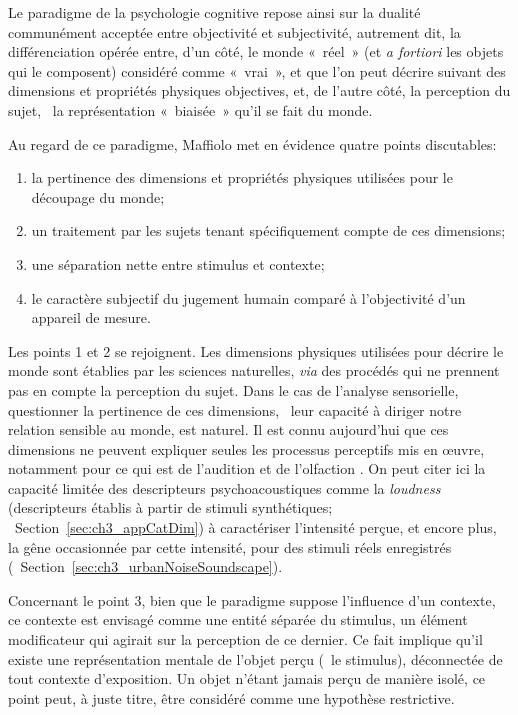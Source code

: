 Le paradigme de la psychologie cognitive repose ainsi sur la dualité communément acceptée entre objectivité et subjectivité, autrement dit, la différenciation opérée entre, d'un côté, le monde «~réel~» (et \emph{a fortiori} les objets qui le composent) considéré comme «~vrai~», et que l'on peut décrire suivant des dimensions et propriétés physiques objectives, et, de l'autre côté, la perception du sujet, \ie~la représentation «~biaisée~» qu'il se fait du monde.

Au regard de ce paradigme, Maffiolo met en évidence quatre points discutables:

\begin{enumerate}
\item la pertinence des dimensions et propriétés physiques utilisées pour le découpage du monde; 
\item un traitement par les sujets tenant spécifiquement compte de ces dimensions;
\item une séparation nette entre stimulus et contexte;
\item le caractère subjectif du jugement humain comparé à l'objectivité d'un appareil de mesure.
\end{enumerate}


Les points 1 et 2 se rejoignent. Les dimensions physiques utilisées pour décrire le monde sont établies par les sciences naturelles, \emph{via} des procédés qui ne prennent pas en compte la perception du sujet. Dans le cas de l'analyse sensorielle, questionner la pertinence de ces dimensions, \ie~leur capacité à diriger notre relation sensible au monde, est naturel. Il est connu aujourd'hui que ces dimensions ne peuvent expliquer seules les processus perceptifs mis en œuvre, notamment pour ce qui est de l'audition et de l'olfaction \citep{dubois2000categories}. On peut citer ici la capacité limitée des descripteurs psychoacoustiques comme la \emph{loudness} (descripteurs établis à partir de stimuli synthétiques; \cf~Section~\ref{sec:ch3_appCatDim}) à caractériser l'intensité perçue, et encore plus, la gêne occasionnée par cette intensité, pour des stimuli réels enregistrés (\cf~Section~\ref{sec:ch3_urbanNoiseSoundscape}). 

Concernant le point 3, bien que le paradigme suppose l'influence d'un contexte, ce contexte est envisagé comme une entité séparée du stimulus, un élément modificateur qui agirait sur la perception de ce dernier. Ce fait implique qu'il existe une représentation mentale de l'objet perçu (\ie~le stimulus), déconnectée de tout contexte d'exposition. Un objet n'étant jamais perçu de manière isolé, ce point peut, à juste titre, être considéré comme une hypothèse restrictive.

